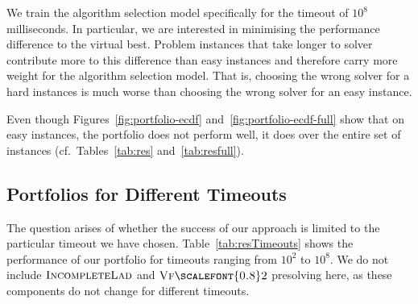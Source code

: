 \documentclass{llncs}
\newcommand{\VFtwo}{$\textsc{Vf{\scalefont{0.8}2}}$\xspace}
\newcommand{\IncompleteLAD}{$\textsc{IncompleteLad}$\xspace}
\begin{document}
We train the algorithm selection model specifically for the timeout of $10^8$
milliseconds. In particular, we are interested in minimising the performance
difference to the virtual best. Problem instances that take longer to solver
contribute more to this difference than easy instances and therefore carry more
weight for the algorithm selection model. That is, choosing the wrong solver for
a hard instances is much worse than choosing the wrong solver for an easy
instance.

Even though Figures~\ref{fig:portfolio-ecdf} and~\ref{fig:portfolio-ecdf-full}
show that on easy instances, the portfolio does not perform well, it does over
the entire set of instances (cf.\ Tables~\ref{tab:res} and~\ref{tab:resfull}).

\subsection{Portfolios for Different Timeouts}

The question arises of whether the success of our approach is limited to the
particular timeout we have chosen. Table~\ref{tab:resTimeouts} shows the
performance of our portfolio for timeouts ranging from $10^2$ to $10^8$. We
do not include \IncompleteLAD and \VFtwo presolving here, as these components do not
change for different timeouts.
\end{document}
